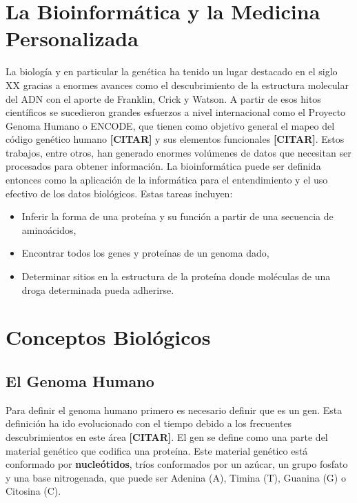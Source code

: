 \section{La Bioinformática y la Medicina Personalizada}

La biología y en particular la genética ha tenido un lugar destacado en el siglo XX gracias a enormes avances como el descubrimiento de la estructura molecular del ADN con el aporte de Franklin, Crick y Watson. A partir de esos hitos científicos se sucedieron grandes esfuerzos a nivel internacional como el Proyecto Genoma Humano o ENCODE, que tienen como objetivo general el mapeo del código genético humano \textbf{[CITAR]} y sus elementos funcionales \textbf{[CITAR]}. Estos trabajos, entre otros, han generado enormes volúmenes de datos que necesitan ser procesados para obtener información. La bioinformática puede ser definida entonces como la aplicación de la informática para el entendimiento y el uso efectivo de los datos biológicos. Estas tareas incluyen:

\begin{itemize}
    \setlength\itemsep{0.5em}
    \item Inferir la forma de una proteína y su función a partir de una secuencia de aminoácidos,
    \item Encontrar todos los genes y proteínas de un genoma dado,
    \item Determinar sitios en la estructura de la proteína donde moléculas de una droga determinada pueda adherirse.
\end{itemize}


\section{Conceptos Biológicos}

\subsection{El Genoma Humano}


Para definir el genoma humano primero es necesario definir que es un gen. Esta definición ha ido evolucionado con el tiempo debido a los frecuentes descubrimientos en este área \textbf{[CITAR]}.   
El gen se define como una parte del material genético que codifica una proteína. Este material genético está conformado por \textbf{nucleótidos}, tríos conformados por un azúcar, un grupo fosfato y una base nitrogenada, que puede ser Adenina (A), Timina (T), Guanina (G) o Citosina (C). 

